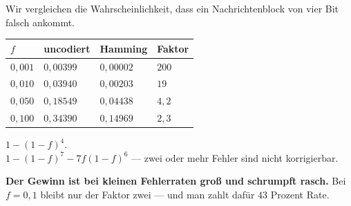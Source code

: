 \begin{merksatz}
Wir vergleichen die Wahrscheinlichkeit, dass ein Nachrichtenblock von vier Bit falsch ankommt.

\begin{center}
{\small
\renewcommand{\arraystretch}{1.48}
\begin{tabular}{@{}P{1.4cm}P{2.2cm}P{2.2cm}P{2.0cm}@{}}
\toprule
$f$ & \textbf{uncodiert} & \textbf{Hamming} & \textbf{Faktor}\\
\midrule
$0{,}001$ & $0{,}00399$ & $0{,}00002$ & $200$\\
$0{,}010$ & $0{,}03940$ & $0{,}00203$ & $19$\\
$0{,}050$ & $0{,}18549$ & $0{,}04438$ & $4{,}2$\\
$0{,}100$ & $0{,}34390$ & $0{,}14969$ & $2{,}3$\\
\bottomrule
\end{tabular}}
\end{center}

 $1-(1-f)^4$.\\
 $1-(1-f)^7-7f(1-f)^6$ --- zwei oder mehr Fehler sind nicht korrigierbar.

\begin{center}
\begin{minipage}{0.9\textwidth}
\textbf{Der Gewinn ist bei kleinen Fehlerraten groß und schrumpft rasch.} Bei $f=0{,}1$ bleibt nur der Faktor zwei --- und man zahlt dafür $43$ Prozent Rate.
\end{minipage}
\end{center}

\begin{center}
\begin{minipage}{0.88\textwidth}
\end{minipage}
\end{center}
\end{merksatz}

